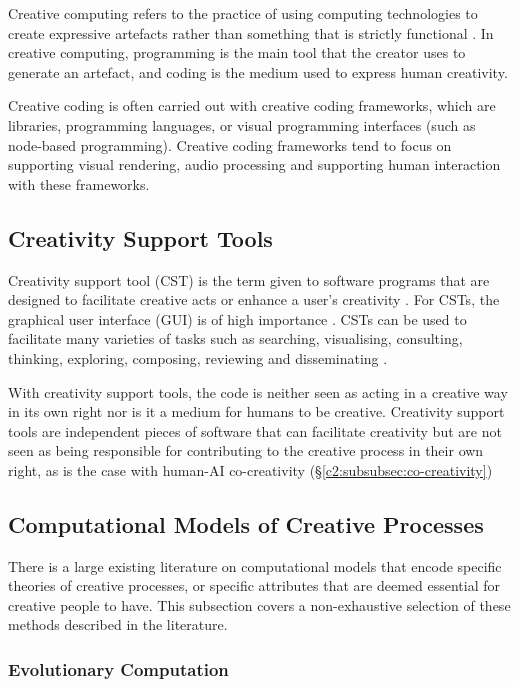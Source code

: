 Creative computing refers to the practice of using computing technologies to create expressive artefacts rather than something that is strictly functional \citep{yang2016promoting}.
In creative computing, programming is the main tool that the creator uses to generate an artefact, and coding is the medium used to express human creativity. 

Creative coding is often carried out with creative coding frameworks, which are libraries, programming languages, or visual programming interfaces (such as node-based programming). 
Creative coding frameworks tend to focus on supporting visual rendering, audio processing and supporting human interaction with these frameworks. 


\subsection{Creativity Support Tools}
\label{c2:subsec:cst}

Creativity support tool (CST) is the term given to software programs that are designed to facilitate creative acts or enhance a user's creativity \citep{shneiderman2002creativity}. 
For CSTs, the graphical user interface (GUI) is of high importance \citep{shneiderman1999user}. 
CSTs can be used to facilitate many varieties of tasks such as searching, visualising, consulting, thinking, exploring, composing, reviewing and disseminating \citep{shneiderman2002cst_tutorial}.

With creativity support tools, the code is neither seen as acting in a creative way in its own right nor is it a medium for humans to be creative. 
Creativity support tools are independent pieces of software that can facilitate creativity but are not seen as being responsible for contributing to the creative process in their own right, as is the case with human-AI co-creativity (\S \ref{c2:subsubsec:co-creativity})

\subsection{Computational Models of Creative Processes}

There is a large existing literature on computational models that encode specific theories of creative processes, or specific attributes that are deemed essential for creative people to have.
This subsection covers a non-exhaustive selection of these methods described in the literature.

\subsubsection{Evolutionary Computation}

